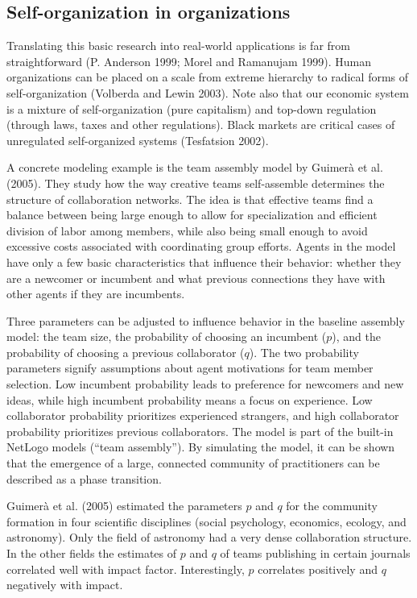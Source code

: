 \documentclass[
  a4paper,
  DIV=11,
  numbers=noendperiod,
  oneside]{scrreprt}
\begin{document}
\hypertarget{sec-Selforganization-in-organizations}{%
\subsection{Self-organization in
organizations}\label{sec-Selforganization-in-organizations}}

Translating this basic research into real-world applications is far from
straightforward (P. Anderson 1999; Morel and Ramanujam 1999). Human
organizations can be placed on a scale from extreme hierarchy to radical
forms of self-organization (Volberda and Lewin 2003). Note also that our
economic system is a mixture of self-organization (pure capitalism) and
top-down regulation (through laws, taxes and other regulations). Black
markets are critical cases of unregulated self-organized systems
(Tesfatsion 2002).

A concrete modeling example is the team assembly model by Guimerà et al.
(2005). They study how the way creative teams self-assemble determines
the structure of collaboration networks. The idea is that effective
teams find a balance between being large enough to allow for
specialization and efficient division of labor among members, while also
being small enough to avoid excessive costs associated with coordinating
group efforts. Agents in the model have only a few basic characteristics
that influence their behavior: whether they are a newcomer or incumbent
and what previous connections they have with other agents if they are
incumbents.

Three parameters can be adjusted to influence behavior in the baseline
assembly model: the team size, the probability of choosing an incumbent
(\(p\)), and the probability of choosing a previous collaborator
(\(q\)). The two probability parameters signify assumptions about agent
motivations for team member selection. Low incumbent probability leads
to preference for newcomers and new ideas, while high incumbent
probability means a focus on experience. Low collaborator probability
prioritizes experienced strangers, and high collaborator probability
prioritizes previous collaborators. The model is part of the built-in
NetLogo models (``team assembly''). By simulating the model, it can be
shown that the emergence of a large, connected community of
practitioners can be described as a phase transition.

Guimerà et al. (2005) estimated the parameters \(p\) and \(q\) for the
community formation in four scientific disciplines (social psychology,
economics, ecology, and astronomy). Only the field of astronomy had a
very dense collaboration structure. In the other fields the estimates of
\(p\) and \(q\) of teams publishing in certain journals correlated well
with impact factor. Interestingly, \(p\) correlates positively and \(q\)
negatively with impact.
\end{document}
